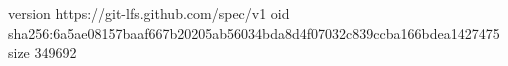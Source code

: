 version https://git-lfs.github.com/spec/v1
oid sha256:6a5ae08157baaf667b20205ab56034bda8d4f07032c839ccba166bdea1427475
size 349692
